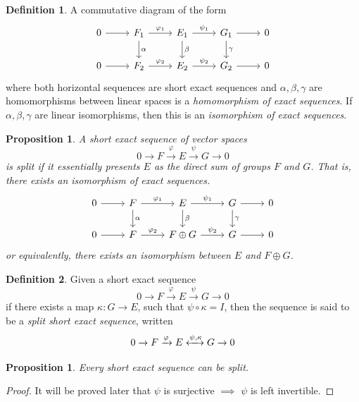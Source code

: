 \documentclass{article}
\newtheorem{proposition}[theorem]{Proposition}
\theoremstyle{remark}
\theoremstyle{definition}
\newtheorem{definition}{Definition}[section]
\begin{document}
\begin{definition}
A commutative diagram of the form
\[\begin{tikzcd}
    0 \arrow{r} & F_1 \arrow{d}{\alpha} \arrow{r}{\varphi_1} & E_1 \arrow{d}{\beta} \arrow{r}{\psi_1} & G_1 \arrow{d}{\gamma} \arrow{r} & 0 \\
    0 \arrow{r} & F_2 \arrow{r}{\varphi_2} & E_2 \arrow{r}{\psi_2} & G_2 \arrow{r} & 0 
\end{tikzcd}\]
where both horizontal sequences are short exact sequences and $\alpha, \beta, \gamma$ are homomorphisms between linear spaces is a \textit{homomorphism of exact sequences}. If $\alpha, \beta, \gamma$ are linear isomorphisms, then this is an \textit{isomorphism of exact sequences}. 
\end{definition}

\begin{proposition}
A short exact sequence of vector spaces
\[0 \xrightarrow{} F \xrightarrow{\varphi} E \xrightarrow{\psi} G \xrightarrow{} 0\]
is split if it essentially presents $E$ as the direct sum of groups $F$ and $G$. That is, there exists an isomorphism of exact sequences.
\[\begin{tikzcd}
    0 \arrow{r} & F \arrow{d}{\alpha} \arrow{r}{\varphi_1} & E \arrow{d}{\beta} \arrow{r}{\psi_1} & G \arrow{d}{\gamma} \arrow{r} & 0 \\
    0 \arrow{r} & F \arrow{r}{\varphi_2} & F \oplus G \arrow{r}{\psi_2} & G \arrow{r} & 0 
\end{tikzcd}\]
or equivalently, there exists an isomorphism between $E$ and $F \oplus G$. 
\end{proposition}

\begin{definition}
Given a short exact sequence
\[0 \xrightarrow{} F \xrightarrow{\varphi} E \xrightarrow{\psi} G \xrightarrow{} 0\]
if there exists a map $\kappa: G \longrightarrow E$, such that $ \psi \circ \kappa = I$, then the sequence is said to be a \textit{split short exact sequence}, written
\[0 \xrightarrow{} F \xrightarrow{\varphi} E \xleftrightarrow{\psi, \kappa} G \xrightarrow{} 0\]
\end{definition}

\begin{proposition}
Every short exact sequence can be split. 
\end{proposition}
\begin{proof}
It will be proved later that $\psi$ is surjective $\implies$ $\psi$ is left invertible. 
\end{proof}
\end{document}

